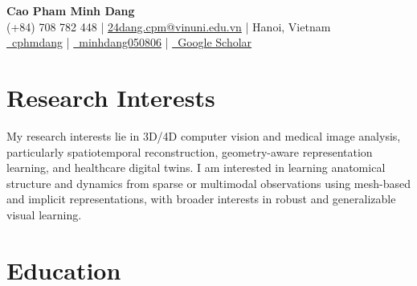 \documentclass[a4paper,10pt]{article}
\begin{document}
\begin{center}
  {\LARGE\bfseries Cao Pham Minh Dang}\\[0.35em]
  (+84) 708 782 448 \;|\;
  \href{mailto:24dang.cpm@vinuni.edu.vn}{24dang.cpm@vinuni.edu.vn} \;|\;
  Hanoi, Vietnam\\[0.18em]
  \href{https://www.linkedin.com/in/cphmdang/}{\faLinkedin\, cphmdang}
\;|\;
\href{https://github.com/minhdang050806}{\faGithub\, minhdang050806}
\;|\;
\href{https://scholar.google.com/citations?user=pt-eC-8AAAAJ\&hl=en}
{\faGraduationCap\, Google Scholar}
\end{center}
\vspace{-0.25em}

\section{Research Interests}
My research interests lie in 3D/4D computer vision and medical image analysis, particularly spatiotemporal reconstruction, geometry-aware representation learning, and healthcare digital twins. I am interested in learning anatomical structure and dynamics from sparse or multimodal observations using mesh-based and implicit representations, with broader interests in robust and generalizable visual learning.
\section{Education}
\end{document}
